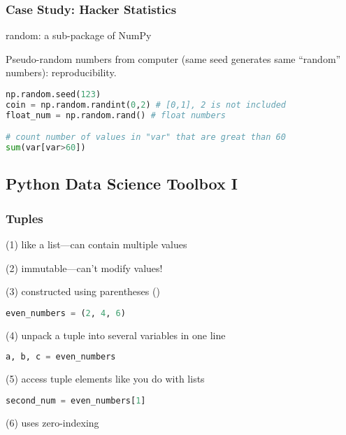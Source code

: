 \documentclass[12pt]{article}
\newcommand{\q}[1]{``#1''}
\begin{document}
\subsubsection{\normalsize Case Study: Hacker Statistics}
random: a sub-package of NumPy

\noindent
Pseudo-random numbers from computer (same seed generates same \q{random} numbers): reproducibility.
\begin{lstlisting}[language=Python]
np.random.seed(123)
coin = np.random.randint(0,2) # [0,1], 2 is not included
float_num = np.random.rand() # float numbers 

# count number of values in "var" that are great than 60
sum(var[var>60])
\end{lstlisting}



\newpage
\subsection{\large Python Data Science Toolbox I}
\subsubsection{\normalsize Tuples}
\noindent
(1) like a list---can contain multiple values

\noindent
(2) immutable---can't modify values!

\noindent
(3) constructed using parentheses ()
\begin{lstlisting}[language=Python]
even_numbers = (2, 4, 6)
\end{lstlisting}

\noindent
(4) unpack a tuple into several variables in one line
\begin{lstlisting}[language=Python]
a, b, c = even_numbers
\end{lstlisting}

\noindent
(5) access tuple elements like you do with lists
\begin{lstlisting}[language=Python]
second_num = even_numbers[1]
\end{lstlisting}

\noindent
(6) uses zero-indexing

\end{document}
